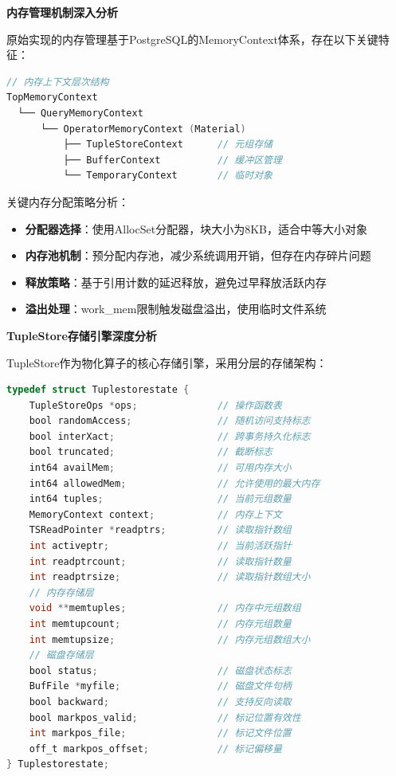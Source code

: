 \textbf{内存管理机制深入分析}

原始实现的内存管理基于PostgreSQL的MemoryContext体系，存在以下关键特征：

\begin{lstlisting}[language=C, caption=内存上下文管理机制]
// 内存上下文层次结构
TopMemoryContext
  └── QueryMemoryContext 
      └── OperatorMemoryContext (Material)
          ├── TupleStoreContext      // 元组存储
          ├── BufferContext          // 缓冲区管理  
          └── TemporaryContext       // 临时对象
\end{lstlisting}

关键内存分配策略分析：

\begin{itemize}
    \item \textbf{分配器选择}：使用AllocSet分配器，块大小为8KB，适合中等大小对象
    \item \textbf{内存池机制}：预分配内存池，减少系统调用开销，但存在内存碎片问题
    \item \textbf{释放策略}：基于引用计数的延迟释放，避免过早释放活跃内存
    \item \textbf{溢出处理}：work\_mem限制触发磁盘溢出，使用临时文件系统
\end{itemize}

\textbf{TupleStore存储引擎深度分析}

TupleStore作为物化算子的核心存储引擎，采用分层的存储架构：

\begin{lstlisting}[language=C, caption=TupleStore内部结构分析]
typedef struct Tuplestorestate {
    TupleStoreOps *ops;              // 操作函数表
    bool randomAccess;               // 随机访问支持标志
    bool interXact;                  // 跨事务持久化标志
    bool truncated;                  // 截断标志
    int64 availMem;                  // 可用内存大小
    int64 allowedMem;                // 允许使用的最大内存
    int64 tuples;                    // 当前元组数量
    MemoryContext context;           // 内存上下文
    TSReadPointer *readptrs;         // 读取指针数组
    int activeptr;                   // 当前活跃指针
    int readptrcount;                // 读取指针数量
    int readptrsize;                 // 读取指针数组大小
    // 内存存储层
    void **memtuples;                // 内存中元组数组
    int memtupcount;                 // 内存元组数量 
    int memtupsize;                  // 内存元组数组大小
    // 磁盘存储层
    bool status;                     // 磁盘状态标志
    BufFile *myfile;                 // 磁盘文件句柄
    bool backward;                   // 支持反向读取
    bool markpos_valid;              // 标记位置有效性
    int markpos_file;                // 标记文件位置
    off_t markpos_offset;            // 标记偏移量
} Tuplestorestate;
\end{lstlisting}

